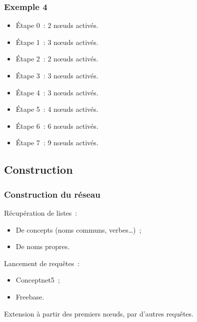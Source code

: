 \documentclass[12pt, handout]{beamer}
\begin{document}
\begin{frame}
 \frametitle{Exemple 4}
 
 \begin{itemize}
 \item Étape 0~: 2  n\oe{}uds activés.
 \item Étape 1~: 3  n\oe{}uds activés.
 \item Étape 2~: 2 n\oe{}uds activés.
 \item Étape 3~: 3 n\oe{}uds activés.
 \item Étape 4~: 3 n\oe{}uds activés.
 \item Étape 5~: 4 n\oe{}uds activés.
 \item Étape 6~: 6 n\oe{}uds activés.
 \item Étape 7~: 9 n\oe{}uds activés.
\end{itemize}

 
\end{frame}



\subsection{Construction}

\begin{frame}
 \frametitle{Construction du réseau}
 
 Récupération de listes~:
 
 \begin{itemize}
  \item De concepts (noms communs, verbes\ldots{})~;
  \item De noms propres.
 \end{itemize}

 \pause{}
 
 Lancement de requêtes~:
 \begin{itemize}
  \item Conceptnet5~;
  \item Freebase.
 \end{itemize}
 
 \pause{}
 
 Extension à partir des premiers n\oe{}uds, par d'autres requêtes.
 
 
\end{frame}
\end{document}
